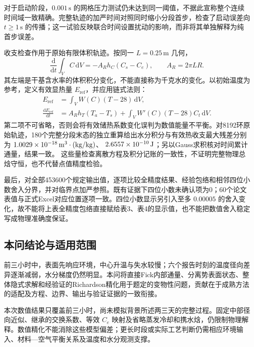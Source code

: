 对于启动阶段，\(0.001\,\mathrm s\) 的网格压力测试仍未达到同一阈值，不据此宣称整个连续时间域一致精确。完整轨迹的加严时间对照同时缩小分段首步，检查了启动误差向 \(t\geq1\,\mathrm s\) 的传播；这一试验反映联合时间设置扰动的影响，而非将其单独解释为纯首步误差。

收支检查作用于原始有限体积轨迹。按同一 \(L=0.25\,\mathrm m\) 几何，
\begin{equation}
\frac{\mathrm d}{\mathrm dt}\int_V C\,\mathrm dV
=-A_Rh_C(C_s-C_e),\qquad A_R=2\pi LR .
\label{eq:q2-moisture-ledger}
\end{equation}
其左端是干基含水率的体积积分变化，不能直接称为千克水的变化。以初始温度为参考，定义有效显热量 \(E_{\mathrm{ref}}\)，并应用链式法则：
\begin{equation}
\begin{aligned}
E_{\mathrm{ref}}&=\int_V W(C)(T-28)\,\mathrm dV,\\
\frac{\mathrm dE_{\mathrm{ref}}}{\mathrm dt}
&=A_Rh_T(T_a-T_s)+
\int_V W'(C)(T-28)C_t\,\mathrm dV .
\end{aligned}
\label{eq:q2-heat-ledger}
\end{equation}
第二项不可省略，否则会将有效储热系数变化误判为数值能量不平衡。对8192环原始轨迹，180个完整分段末态的独立重算给出水分积分与有效热收支最大残差分别为
\(1.0029\times10^{-18}\,\mathrm{m^3}\cdot(\mathrm{kg/kg})\)、
\(2.6557\times10^{-10}\,\mathrm J\)；另以Gauss求积核对时间累计通量，结果一致。
这些量检查离散方程及积分记账的一致性，不证明完整物理总焓守恒，也不代替点值精度检验。

最后，对全部453600个规定输出值，逐项比较全精度结果、经验包络和相邻四位小数舍入分界，并对临界点加严参照。既有证据下四位小数未确认项为0；60个论文表值与正式Excel对应位置逐项一致。四位小数显示另引入至多 \(0.00005\) 的舍入变化，故不能将上表全精度包络直接赋给表3、表4的显示值，也不能把数值舍入稳定写成物理准确度保证。

\subsection{本问结论与适用范围}

前三小时中，表面先响应环境，中心升温与失水较慢；六个报告时刻的温度径向差异逐渐减弱，水分梯度仍然明显。本问将直接Fick内部通量、分离势表面状态、整体隐式求解和经验证的Richardson精化用于题定的变物性问题，贡献在于成熟方法的适配及方程、边界、输出与验证证据的一致衔接。

本次数值结果只覆盖前三小时，尚未模拟背景所述两三天的完整过程。固定中部径向近似、继承的交换系数、等效 \(C_e\) 映射及省略蒸发冷却和携水焓，仍限制物理解释。数值精化不能消除这些模型偏差；更长时段或实际工艺判断仍需相应环境输入、材料—空气平衡关系及温度和水分观测支撑。
